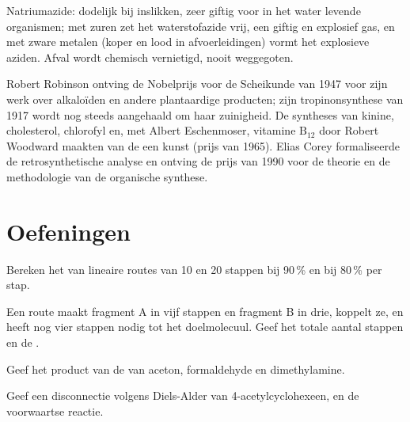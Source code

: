 \begin{safety}{}
Natriumazide: dodelijk bij inslikken, zeer giftig voor in het water
levende organismen; met zuren zet het waterstofazide vrij, een giftig en
explosief gas, en met zware metalen (koper en lood in afvoerleidingen)
vormt het explosieve aziden. Afval wordt chemisch vernietigd, nooit
weggegoten.
\end{safety}

\begin{history}
Robert Robinson ontving de Nobelprijs voor de Scheikunde van 1947 voor
zijn werk over alkaloïden en andere plantaardige producten; zijn
tropinonsynthese van 1917 wordt nog steeds aangehaald om haar
zuinigheid. De syntheses van kinine, cholesterol, chlorofyl en, met
Albert Eschenmoser, vitamine $\mathrm B_{12}$ door Robert Woodward maakten van de
 een kunst (prijs van 1965). Elias Corey formaliseerde de
retrosynthetische analyse en ontving de prijs van 1990 voor de theorie
en de methodologie van de organische synthese.
\end{history}

\section{Oefeningen}

\begin{exercise}[$\star$]\label{exo:b3:total-synthesis:1}
Bereken het  van lineaire routes van 10 en 20 stappen bij
90\,\% en bij 80\,\% per stap.
\end{exercise}

\begin{exercise}[$\star$]\label{exo:b3:total-synthesis:2}
Een route maakt fragment A in vijf stappen en fragment B in drie, koppelt
ze, en heeft nog vier stappen nodig tot het doelmolecuul. Geef het totale
aantal stappen en de .
\end{exercise}

\begin{exercise}[$\star$]\label{exo:b3:total-synthesis:3}
Geef het product van de  van aceton, formaldehyde en
dimethylamine.
\end{exercise}

\begin{exercise}[$\star$]\label{exo:b3:total-synthesis:4}
Geef een disconnectie volgens Diels-Alder van 4-acetylcyclohexeen, en de
voorwaartse reactie.
\end{exercise}

